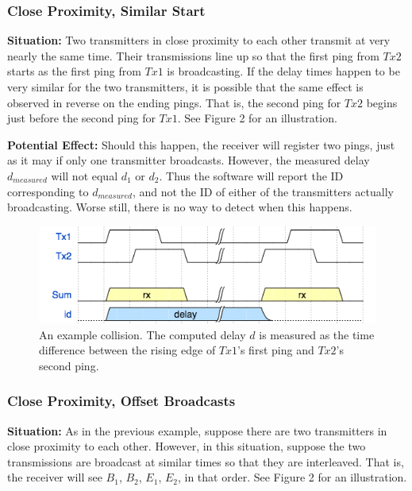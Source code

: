 \documentclass[12pt]{article}
\begin{document}
\subsubsection{Close Proximity, Similar Start}

{\bf Situation:} Two transmitters in close proximity to each other transmit at
very nearly the same time.
Their transmissions line up so that the first ping from $Tx2$ starts as the
first ping from $Tx1$ is broadcasting.
If the delay times happen to be very similar for the two transmitters,
it is possible that the same effect is observed in reverse on the ending
pings. That is, the second ping for $Tx2$ begins just before the second ping
for $Tx1$. See Figure 2 for an illustration.

{\bf Potential Effect:}
Should this happen, the receiver will register two pings, just as it may if
only one transmitter broadcasts. However, the measured delay
$d_{measured}$ will not equal $d_1$ or $d_2$.
Thus the software will report the ID corresponding to $d_{measured}$, and
not the ID of either of the transmitters actually broadcasting. Worse still,
there is no way to detect when this happens.

\begin{figure}[h]
	\centering
		\includegraphics[scale=0.7]{collision1}
		
		\caption{An example collision. The computed delay $d$ is
		measured as the time difference between the rising edge of
		$Tx1$'s first ping and $Tx2$'s second ping.}
\end{figure}

\subsubsection{Close Proximity, Offset Broadcasts}

{\bf Situation:} As in the previous example, suppose there are two transmitters
in close proximity to each other.
However, in this situation, suppose the two transmissions are broadcast at
similar times so that they are interleaved.
That is, the receiver will see $B_1$, $B_2$, $E_1$, $E_2$, in that order.
See Figure 2 for an illustration.
\end{document}
